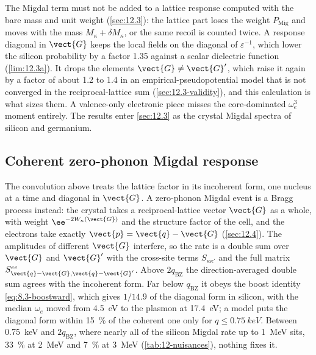 The Migdal term must not be added to a lattice response computed with the bare mass and unit weight (\cref{sec:12.3}): the lattice part loses the weight $P_{\mathrm{Mig}}$ and moves with the mass $M_\kappa + \delta M_\kappa$, or the same recoil is counted twice. A response diagonal in $\vect{G}$ keeps the local fields on the diagonal of $\varepsilon^{-1}$, which lower the silicon probability by a factor 1.35 against a scalar dielectric function (\cref{lim:12.3a}). It drops the elements $\vect{G}\neq\vect{G}'$, which raise it again by a factor of about 1.2 to 1.4 in an empirical-pseudopotential model that is not converged in the reciprocal-lattice sum (\cref{sec:12.3-validity}), and this calculation is what sizes them. A valence-only electronic piece misses the core-dominated $\omega_e^3$ moment entirely. The results enter \cref{sec:12.3} as the crystal Migdal spectra of silicon and germanium.

\subsection{Coherent zero-phonon Migdal response}

The convolution above treats the lattice factor in its incoherent form, one nucleus at a time and diagonal in $\vect{G}$. A zero-phonon Migdal event is a Bragg process instead: the crystal takes a reciprocal-lattice vector $\vect{G}$ as a whole, with weight $\ee^{-2W_\kappa(\vect{G})}$ and the structure factor of the cell, and the electrons take exactly $\vect{p} = \vect{q} - \vect{G}$ (\cref{sec:12.4}). The amplitudes of different $\vect{G}$ interfere, so the rate is a double sum over $\vect{G}$ and $\vect{G}'$ with the cross-site terms $S_{\kappa\kappa'}$ and the full matrix $S^{ee}_{\vect{q}-\vect{G},\vect{q}-\vect{G}'}$. Above $2q_{\mathrm{BZ}}$ the direction-averaged double sum agrees with the incoherent form. Far below $q_{\mathrm{BZ}}$ it obeys the boost identity \cref{eq:8.3-boostward}, which gives $1/14.9$ of the diagonal form in silicon, with the median $\omega_e$ moved from \SI{4.5}{eV} to the plasmon at \SI{17.4}{eV}; a model puts the diagonal form within \SI{15}{\percent} of the coherent one only for $q \le \SI{0.75}{keV}$. Between \SI{0.75}{keV} and $2q_{\mathrm{BZ}}$, where nearly all of the silicon Migdal rate up to \SI{1}{MeV} sits, \SI{33}{\percent} at \SI{2}{MeV} and \SI{7}{\percent} at \SI{3}{MeV} (\cref{tab:12-nuisances}), nothing fixes it.

